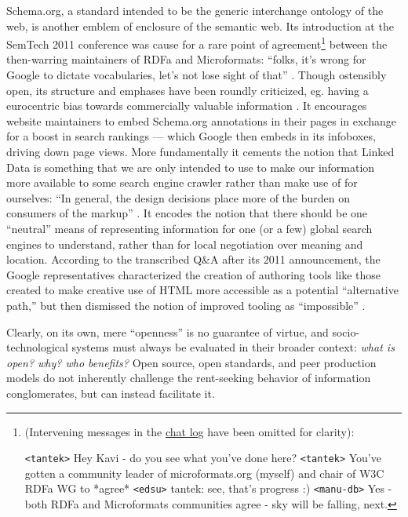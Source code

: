 Schema.org, a standard intended to be the generic interchange ontology
of the web, is another emblem of enclosure of the semantic web. Its
introduction at the SemTech 2011 conference was cause for a rare point
of agreement\footnote{(Intervening messages in the
  \href{https://www.w3.org/2011/06/semtech-bof-notes.html}{chat log}
  have been omitted for clarity):

  \texttt{\textless{}tantek\textgreater{}} Hey Kavi - do you see what
  you've done here? \texttt{\textless{}tantek\textgreater{}} You've
  gotten a community leader of microformats.org (myself) and chair of
  W3C RDFa WG to *agree* \texttt{\textless{}edsu\textgreater{}} tantek:
  see, that's progress :) \texttt{\textless{}manu-db\textgreater{}} Yes
  - both RDFa and Microformats communities agree - sky will be falling,
  next.} between the then-warring maintainers of RDFa and Microformats:
``folks, it's wrong for Google to dictate vocabularies, let's not lose
sight of that'' \cite{SemTech2011BOF2011} . Though ostensibly
open, its structure and emphases have been roundly criticized, eg.
having a eurocentric bias towards commercially valuable information \cite{iliadisOneSchemaRule2023} . It encourages website maintainers to
embed Schema.org annotations in their pages in exchange for a boost in
search rankings --- which Google then embeds in its infoboxes, driving
down page views. More fundamentally it cements the notion that Linked
Data is something that we are only intended to use to make our
information more available to some search engine crawler rather than
make use of for ourselves: ``In general, the design decisions place more
of the burden on consumers of the markup'' \cite{guhaSchemaOrgEvolution2015} . It encodes the notion that there should
be one ``neutral'' means of representing information for one (or a few)
global search engines to understand, rather than for local negotiation
over meaning and location. According to the transcribed Q\&A after its
2011 announcement, the Google representatives characterized the creation
of authoring tools like those created to make creative use of HTML more
accessible as a potential ``alternative path,'' but then dismissed the
notion of improved tooling as ``impossible'' \cite{hawkeNotesSessionSemTech2011} .

Clearly, on its own, mere ``openness'' is no guarantee of virtue, and
socio-technological systems must always be evaluated in their broader
context: \emph{what is open? why? who benefits?} Open source, open
standards, and peer production models do not inherently challenge the
rent-seeking behavior of information conglomerates, but can instead
facilitate it.

